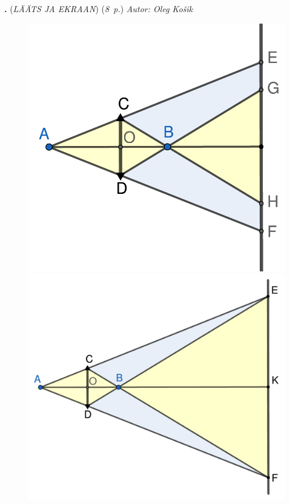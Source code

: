 \documentclass[11pt,a5paper]{article}
\newcommand{\numb}[1]{\vspace{5pt}\textbf{\large #1}}
\newcommand{\nimi}[1]{(\textsl{\small #1})}
\newcommand{\punktid}[1]{(\emph{#1~p.})}
\newcounter{ylesanne}
\newcommand{\yl}[1]{\addtocounter{ylesanne}{1}\numb{\theylesanne.} \nimi{#1} \newblock{}}
\newcommand{\autor}[1]{\emph{ Autor: #1}} %
\begin{document}
\yl{LÄÄTS JA EKRAAN}
\punktid{8} \autor{Oleg Košik}\par
\begin{figure}[!h]
  \centering
  \begin{minipage}[c]{0.39\textwidth}
    \includegraphics[width=\textwidth]{laatsekraan2}
  \end{minipage}
  \hfill
  \begin{minipage}[c]{0.60\textwidth}
    \vspace*{-2pt}
    \includegraphics[width=\textwidth]{laatsekraan1}
  \end{minipage}
\end{figure}
\end{document}
